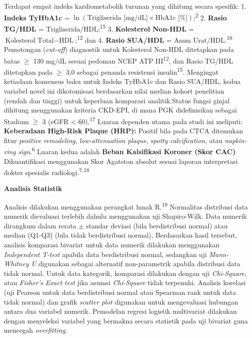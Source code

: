 \documentclass[
  indonesian,
]{agujournal2019}
\begin{document}
Terdapat empat indeks kardiometabolik turunan yang dihitung secara
spesifik: 1. \textbf{Indeks TyHbA1c} =
\(\ln(\text{Trigliserida [mg/dL]} \times \text{HbA1c [\%]})\);\textsuperscript{2}
2. \textbf{Rasio TG/HDL} =
\(\text{Trigliserida} / \text{HDL}\);\textsuperscript{15} 3.
\textbf{Kolesterol Non-HDL} =
\(\text{Kolesterol Total} - \text{HDL}\);\textsuperscript{12} dan 4.
\textbf{Rasio SUA/HDL} =
\(\text{Asam Urat} / \text{HDL}\).\textsuperscript{16} Pemotongan
(\emph{cut-off}) diagnostik untuk Kolesterol Non-HDL ditetapkan pada
batas \(\ge\) 130 mg/dL sesuai pedoman NCEP ATP III\textsuperscript{12},
dan Rasio TG/HDL ditetapkan pada \(\ge\) 3,0 sebagai penanda resistensi
insulin\textsuperscript{15}. Mengingat ketiadaan konsensus baku untuk
Indeks TyHbA1c dan Rasio SUA/HDL, kedua variabel novel ini dikotomisasi
berdasarkan nilai median kohort penelitian (rendah dan tinggi) untuk
keperluan komparasi analitik.Status fungsi ginjal dihitung menggunakan
kriteria CKD-EPI, di mana PGK didefinisikan sebagai Stadium \(\ge\) 3
(eGFR \textless{} 60).\textsuperscript{17} Luaran dependen utama pada
studi ini meliputi: \textbf{Keberadaan High-Risk Plaque (HRP):} Positif
bila pada CTCA ditemukan fitur \emph{positive remodeling},
\emph{low-attenuation plaque}, \emph{spotty calcification}, atau
\emph{napkin-ring sign}.\textsuperscript{6} Luaran kedua adalah
\textbf{Beban Kalsifikasi Koroner (Skor CAC)} Dikuantifikasi menggunakan
Skor Agatston absolut sesuai laporan interpretasi dokter spesialis
radiologi.\textsuperscript{7,18}

\textbf{Analisis Statistik}

Analisis dilakukan menggunakan perangkat lunak R.\textsuperscript{19}
Normalitas distribusi data numerik dievaluasi terlebih dahulu
menggunakan uji Shapiro-Wilk. Data numerik dirangkum dalam rerata
\(\pm\) standar deviasi (bila berdistribusi normal) atau median (Q1-Q3)
(bila tidak berdistribusi normal). Berdasarkan hasil tersebut, analisis
komparasi bivariat untuk data numerik dilakukan menggunakan
\emph{Independent T-test} apabila data berdistribusi normal, sedangkan
uji \emph{Mann-Whitney U} digunakan sebagai alternatif non-parametrik
apabila distribusi data tidak normal. Untuk data kategorik, komparasi
dilakukan dengan uji \emph{Chi-Square}, atau \emph{Fisher's Exact test}
jika asumsi \emph{Chi-Square} tidak terpenuhi. Analisis korelasi (uji
Pearson untuk data berdistribusi normal atau Spearman rank untuk data
tidak normal) dan grafik \emph{scatter plot} digunakan untuk
mengevaluasi hubungan antara dua variabel numerik. Pemodelan regresi
logistik multivariat dilakukan dengan menyeleksi variabel yang bermakna
secara statistik pada uji bivariat guna mencegah \emph{overfitting}.
\end{document}
